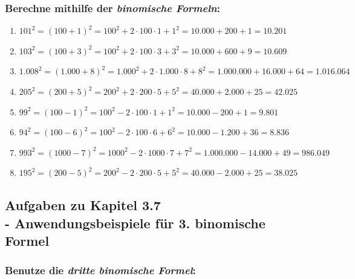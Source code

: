 \documentclass[a4paper,12pt]{article} %
\begin{document}
\subsubsection{Berechne mithilfe der \textit{binomische Formeln}:} %

\begin{enumerate}[label=\alph*)]

  \item \({101}^2 = {(100 + 1)}^2 = 100^2 + 2 \cdot 100 \cdot 1 + 1^2 = 10.000 + 200 + 1 = \mathbf{10.201}\) %

  \item \({103}^2 = {(100 + 3)}^2 = 100^2 + 2 \cdot 100 \cdot 3 + 3^2 = 10.000 + 600 + 9 = \mathbf{10.609}\) %

  \item \({1.008}^2 = {(1.000 + 8)}^2 = 1.000^2 + 2 \cdot 1.000 \cdot 8 + 8^2 = 1.000.000 + 16.000 + 64 = \mathbf{1.016.064}\) %

  \item \({205}^2 = {(200 + 5)}^2 = 200^2 + 2 \cdot 200 \cdot 5 + 5^2 = 40.000 + 2.000 + 25 = \mathbf{42.025}\) %

  \item \({99}^2 = {(100 - 1)}^2 = 100^2 - 2 \cdot 100 \cdot 1 + 1^2 = 10.000 - 200 + 1 = \mathbf{9.801}\) %

  \item \({94}^2 = {(100 - 6)}^2 = 100^2 - 2 \cdot 100 \cdot 6 + 6^2 = 10.000 - 1.200 + 36 = \mathbf{8.836}\) %

  \item \({993}^2 = {(1000 - 7)}^2 = 1000^2 - 2 \cdot 1000 \cdot 7 + 7^2 = 1.000.000 - 14.000 + 49 = \mathbf{986.049}\) %

  \item \({195}^2 = {(200 - 5)}^2 = 200^2 - 2 \cdot 200 \cdot 5 + 5^2 = 40.000 - 2.000 + 25 = \mathbf{38.025}\) %

\end{enumerate}

\subsection{Aufgaben zu Kapitel 3.7 \\
  - Anwendungsbeispiele für 3. binomische Formel}

\subsubsection{Benutze die \textit{dritte binomische Formel}:} %
\end{document}

